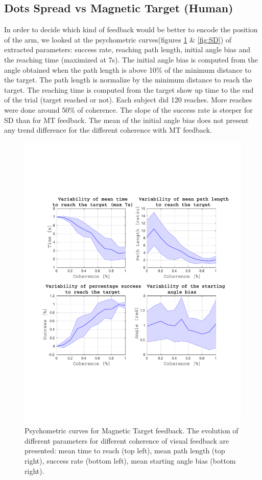 \documentclass[preprint,12pt]{elsarticle}
\begin{document}
\subsection{Dots Spread vs Magnetic Target (Human)}
In order to decide which kind of feedback would be better to encode the position of the arm, we looked at the psychometric curves(figures \ref{fig:MT} \& \ref{fig:SD}) of extracted parameters: success rate, reaching path length, initial angle bias and the reaching time (maximized at 7s). The initial angle bias is computed from the angle obtained when the path length is above 10\% of the minimum distance to the target. The path length is normalize by the minimum distance to reach the target. The reaching time is computed from the target show up time to the end of the trial (target reached or not). Each subject did 120 reaches. More reaches were done around 50\% of coherence. The slope of the success rate is steeper for SD than for MT feedback. The mean of the initial angle bias does not present any trend difference for the different coherence with MT feedback.
\begin{figure}[htbp]
\centering
\includegraphics[width=1\textwidth,trim={1.5cm 5cm 1.2cm 5cm},clip]{figures/MD_mean_human.pdf}
\caption{Psychometric curves for Magnetic Target feedback. The evolution of different parameters for different coherence of visual feedback are presented: mean time to reach (top left), mean path length (top right), success rate (bottom left), mean starting angle bias (bottom right).}
\label{fig:MT}
\end{figure}
\end{document}

